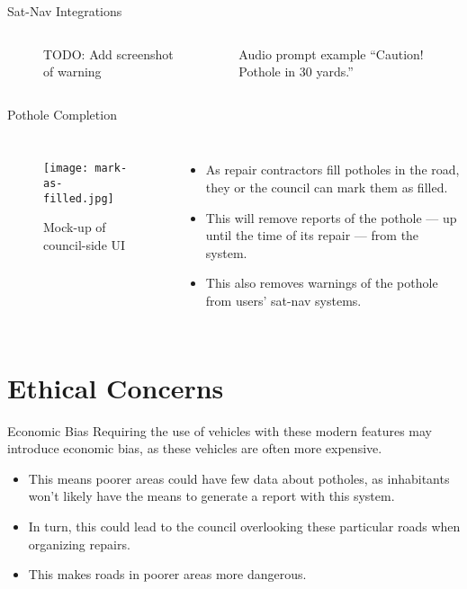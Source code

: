 \documentclass{beamer}
\begin{document}
\begin{frame}{Sat-Nav Integrations}
    \begin{columns}
        \begin{figure}
            \caption{TODO: Add screenshot of warning}
        \end{figure}


        \begin{exampleblock}{Audio prompt example}
            ``Caution! Pothole in 30 yards.''
        \end{exampleblock}
    \end{columns}
\end{frame}

\begin{frame}{Pothole Completion}
    \begin{columns}

        \begin{figure}
            \texttt{[image: mark-as-filled.jpg]}
            \caption{Mock-up of council-side UI}
        \end{figure}


        \begin{itemize}
            \item As repair contractors fill potholes in the road, they or the council can mark them as filled.
            \item This will remove reports of the pothole --- up until the time of its repair --- from the system.
            \item This also removes warnings of the pothole from users' sat-nav systems.
        \end{itemize}
    \end{columns}
\end{frame}

\section{Ethical Concerns}

\begin{frame}{Economic Bias}
Requiring the use of vehicles with these modern features may introduce economic bias, as these vehicles are often more expensive.

\begin{itemize}
    \item This means poorer areas could have few data about potholes, as inhabitants won't likely have the means to generate a report with this system.
    \item In turn, this could lead to the council overlooking these particular roads when organizing repairs.
    \item This makes roads in poorer areas more dangerous.
\end{itemize}
\end{frame}
\end{document}
